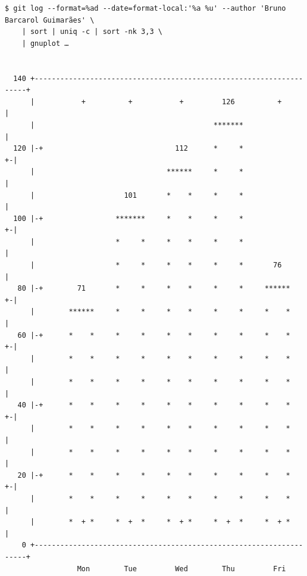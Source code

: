 \begin{frame}[fragile]
    \autotitle
    \tiny
    \begin{verbatim}
$ git log --format=%ad --date=format-local:'%a %u' --author 'Bruno Barcarol Guimarães' \
    | sort | uniq -c | sort -nk 3,3 \
    | gnuplot …


  140 +--------------------------------------------------------------------+
      |           +          +           +         126          +          |
      |                                          *******                   |
  120 |-+                               112      *     *                 +-|
      |                               ******     *     *                   |
      |                     101       *    *     *     *                   |
  100 |-+                 *******     *    *     *     *                 +-|
      |                   *     *     *    *     *     *                   |
      |                   *     *     *    *     *     *       76          |
   80 |-+        71       *     *     *    *     *     *     ******      +-|
      |        ******     *     *     *    *     *     *     *    *        |
   60 |-+      *    *     *     *     *    *     *     *     *    *      +-|
      |        *    *     *     *     *    *     *     *     *    *        |
      |        *    *     *     *     *    *     *     *     *    *        |
   40 |-+      *    *     *     *     *    *     *     *     *    *      +-|
      |        *    *     *     *     *    *     *     *     *    *        |
      |        *    *     *     *     *    *     *     *     *    *        |
   20 |-+      *    *     *     *     *    *     *     *     *    *      +-|
      |        *    *     *     *     *    *     *     *     *    *        |
      |        *  + *     *  +  *     *  + *     *  +  *     *  + *        |
    0 +--------------------------------------------------------------------+
                 Mon        Tue         Wed        Thu         Fri
    \end{verbatim} %
\end{frame}

